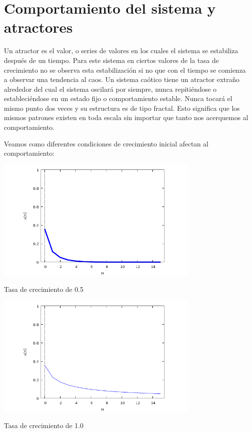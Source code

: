 \documentclass{article} %
\begin{document}
\section*{Comportamiento del sistema y atractores}

Un atractor es el valor, o series de valores en los cuales el sistema se estabiliza después de un tiempo. Para este sistema en ciertos valores de la tasa de crecimiento no se observa esta estabilización si no que con el tiempo se comienza a observar una tendencia al caos. Un sistema caótico tiene un atractor extraño alrededor del cual el sistema oscilará por siempre, nunca repitiéndose o estableciéndose en un estado fijo o comportamiento estable. Nunca tocará el mismo punto dos veces y su estructura es de tipo fractal. Esto significa que los mismos patrones existen en toda escala sin importar que tanto nos acerquemos al comportamiento. 

Veamos como diferentes condiciones de crecimiento inicial afectan al comportamiento:

\begin{center}

	\includegraphics[width=10cm]{1.png}
    
Tasa de crecimiento de 0.5    

\end{center}

\begin{center}

	\includegraphics[width=10cm]{2.png}
    
Tasa de crecimiento de 1.0

\end{center}
\end{document}
